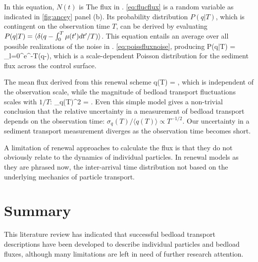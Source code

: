 In this equation, $N(t)$ is \DIFdelbegin {}\DIFdelend \DIFaddbegin {}\DIFaddend The flux in \DIFdelbegin {}\DIFdelend \DIFaddbegin {}\DIFaddend . \ref{eq:flucflux} is a random variable as indicated in \DIFdelbegin {}\DIFdelend \DIFaddbegin {}\DIFaddend \ref{fig:ancey} panel (b). Its probability distribution $P(q|T)$, which is contingent on the observation time $T$, can be derived by evaluating $P(q|T) = \langle \delta(q-\int_0^T \mu(t') dt'/T) \rangle$.
This equation entails an average over all possible realizations of the noise in \DIFdelbegin {}\DIFdelend \DIFaddbegin {}\DIFaddend . \ref{eq:poissfluxnoise}, producing \citep{VanKampen2007}
\be P(q|T) = \sum_{l=0}^\infty {}e^{-\Lambda T}\delta(q-),\ee
which is a scale-dependent Poisson distribution for the sediment flux across the control surface.

The mean flux \DIFaddbegin {}\DIFaddend derived from this renewal scheme \DIFdelbegin {}\DIFdelend \DIFaddbegin {}\DIFaddend \be \langle q(T) \rangle = \Lambda, \ee
which is independent of the observation scale, while the magnitude of bedload transport fluctuations scales with $1/T$: 
\be \sigma_q(T)^2 = .\ee
Even this simple model gives a non-trivial conclusion that the relative uncertainty in a measurement of bedload transport depends on the observation time: $\sigma_q(T)/\langle q(T) \rangle \propto T^{-1/2}.$ Our uncertainty in a sediment transport measurement diverges as the observation time becomes short.

A limitation of renewal approaches to calculate the flux is that they do not obviously relate to the dynamics of individual particles. In renewal models as they are phrased now, the inter-arrival time distribution \DIFdelbegin {}\DIFdelend not based on the underlying mechanics of particle transport. 

\section{Summary}

This literature review has indicated that successful bedload transport descriptions have been developed to describe individual particles and bedload fluxes, although many limitations are left in need of further research attention.

